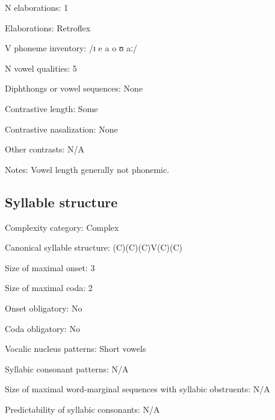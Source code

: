 {\begin{appendixdesc}
\item[N elaborations:] 1

\item[Elaborations:] Retroflex

\item[V phoneme inventory:] /ɪ e a o ʊ aː/

\item[N vowel qualities:] 5

\item[Diphthongs or vowel sequences:] None

\item[Contrastive length:] Some

\item[Contrastive nasalization:] None

\item[Other contrasts:] N/A

\item[Notes:] Vowel length generally not phonemic.
\end{appendixdesc}
\subsection*{Syllable structure}
\begin{appendixdesc}

\item[Complexity category:] Complex

\item[Canonical syllable structure:] (C)(C)(C)V(C)(C) \citep[23--26]{Rumsey1978}

\item[Size of maximal onset:] 3

\item[Size of maximal coda:] 2

\item[Onset obligatory:] No

\item[Coda obligatory:] No

\item[Vocalic nucleus patterns:] Short vowels

\item[Syllabic consonant patterns:] N/A

\item[Size of maximal word-marginal sequences with syllabic obstruents:] N/A

\item[Predictability of syllabic consonants:] N/A


\end{appendixdesc}}
